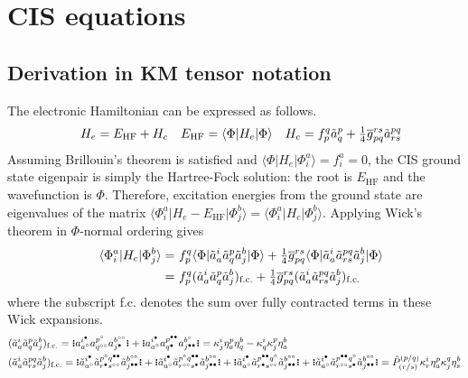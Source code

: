 \documentclass[11pt,fleqn]{article}
\newcommand{\h}{\eta}        %
\renewcommand{\k}{\kappa}    %
\newcommand{\F}{\Phi}        %
\newcommand{\tl}{\ensuremath{\tilde}}
\newcommand{\ol}[1]{\ensuremath{\overline{#1}}}
\newcommand{\op}[1]{\ensuremath{\hat{#1}}}
\newcommand{\ip}[1]{\ensuremath{\langle#1\rangle}}
\newcommand{\GNO}[1]{\setstackgap{S}{0.7pt}\ensuremath{\Shortstack{\textbf{.} \textbf{.} \textbf{.}}#1\Shortstack{\textbf{.} \textbf{.} \textbf{.}}}}
\theoremstyle{mystyle}
\newcommand{\hole}{\circ}
\newcommand{\ptcl}{\bullet}
\begin{document}
\section*{CIS equations}

\subsection*{Derivation in KM tensor notation}

The electronic Hamiltonian can be expressed as follows.
\begin{align}
&&
  H_e
=
  E_{\text{HF}}
+
  H_c
&&
  E_{\text{HF}}
=
  \ip{\F|H_e|\F}
&&
  H_c
=
  f_p^q
  \tl{a}_q^p
+
  \tfrac{1}{4}
  \ol{g}_{pq}^{rs}
  \tl{a}_{rs}^{pq}
\end{align}
Assuming Brillouin's theorem is satisfied and $\ip{\F|H_e|\F_i^a}=f_i^a=0$, the CIS ground state eigenpair is simply the Hartree-Fock solution: the root is $E_{\text{HF}}$ and the wavefunction is $\F$.
Therefore, excitation energies from the ground state are eigenvalues of the matrix $\ip{\F_i^a|H_e-E_{\text{HF}}|\F_j^b}=\ip{\F_i^a|H_c|\F_j^b}$.
Applying Wick's theorem in $\F$-normal ordering gives
\begin{align}
&&\nonumber
  \ip{\F_i^a|H_c|\F_j^b}
=&\
  f_p^q
  \ip{\F|\tl{a}_a^i\tl{a}_q^p\tl{a}_j^b|\F}
+
  \tfrac{1}{4}
  \ol{g}_{pq}^{rs}
  \ip{\F|\tl{a}_a^i\tl{a}_{rs}^{pq}\tl{a}_j^b|\F}
\\&&=&\
\label{cis-matrix-elements}
  f_p^q
  (\tl{a}_a^i\tl{a}_q^p\tl{a}_j^b)_{\text{f.c.}}
+
  \tfrac{1}{4}
  \ol{g}_{pq}^{rs}
  (\tl{a}_a^i\tl{a}_{rs}^{pq}\tl{a}_j^b)_{\text{f.c.}}
\end{align}
where the subscript f.c. denotes the sum over fully contracted terms in these Wick expansions.
\begin{align}
\label{one-electron-coupling-matrix}
&
  (\tl{a}_a^i\tl{a}_q^p\tl{a}_j^b)_{\text{f.c.}}
=
  \GNO{a_{a^\hole}^{i^\ptcl}a_{q^{\hole\hole}}^{p^\hole}a_{j^\ptcl}^{b^{\hole\hole}}}
+
  \GNO{a_{a^\hole}^{i^{\ptcl}}a_{q^{\ptcl}}^{p^{\ptcl\ptcl}}a_{j^{\ptcl\ptcl}}^{b^{\hole}}}
=
  \k^i_j\h_a^p\h_q^b
-
  \k_q^i\k_j^p\h_a^b
\\
\label{two-electron-coupling-matrix}
&
  (\tl{a}_a^i\tl{a}_{rs}^{pq}\tl{a}_j^b)_{\text{f.c.}}
=
  \GNO{
    \tl{a}_{a^\hole}^{i^\ptcl}
    \tl{a}_{r^{\ptcl}s^{\hole\hole}}^{p^{\hole}q^{\ptcl\ptcl}}
    \tl{a}_{j^{\ptcl\ptcl}}^{b^{\hole\hole}}
  }
+
  \GNO{
    \tl{a}_{a^\hole}^{i^\ptcl}
    \tl{a}_{r^{\hole\hole}s^{\ptcl}}^{p^{\hole}q^{\ptcl\ptcl}}
    \tl{a}_{j^{\ptcl\ptcl}}^{b^{\hole\hole}}
  }
+
  \GNO{
    \tl{a}_{a^\hole}^{i^\ptcl}
    \tl{a}_{r^{\ptcl}s^{\hole\hole}}^{p^{\ptcl\ptcl}q^{\hole}}
    \tl{a}_{j^{\ptcl\ptcl}}^{b^{\hole\hole}}
  }
+
  \GNO{
    \tl{a}_{a^\hole}^{i^\ptcl}
    \tl{a}_{r^{\hole\hole}s^{\ptcl}}^{p^{\ptcl\ptcl}q^{\hole}}
    \tl{a}_{j^{\ptcl\ptcl}}^{b^{\hole\hole}}
  }
=
  \op{P}^{(p/q)}_{(r/s)}
  \k^i_r\h^p_a\k^q_j\h^b_s
\end{align}
\end{document}
